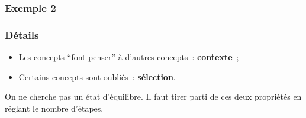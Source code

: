 \documentclass[12pt, handout]{beamer}
\begin{document}
\begin{frame}
  \frametitle{Exemple 2}
% 
% 
%   

\end{frame}


\begin{frame}
 \frametitle{Détails}
 
 \begin{itemize}
  \item Les concepts ``font penser'' à d'autres concepts~: \textbf{contexte}~;
  \item Certains concepts sont oubliés~: \textbf{sélection}.
 \end{itemize}

 On ne cherche pas un état d'équilibre. Il faut tirer parti de ces deux propriétés en réglant le nombre d'étapes.
 
\end{frame}
\end{document}
